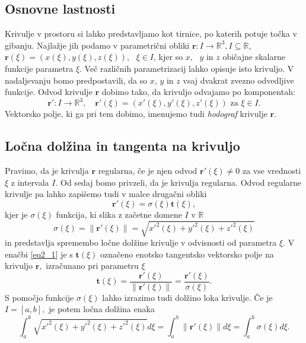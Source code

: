 \documentclass[12pt,a4paper,twoside]{article}
\theoremstyle{definition} %
\theoremstyle{plain} %
\numberwithin{equation}{section}  %
\newcommand{\R}{\mathbb R}
\begin{document}
\subsection{Osnovne lastnosti}

\cite{struik1961lectures}
Krivulje v prostoru si lahko predstavljamo kot tirnice, po katerih potuje točka v gibanju. Najlažje jih podamo
v parametrični obliki $\mathbf{r}:I \to \R^3, I \subseteq \R$, \newline $\mathbf{r}(\xi)=(x(\xi),y(\xi),z(\xi)), \text{ } \xi \in I$, kjer so 
$x,\text{ } y \text{ in } z$ običajne skalarne funkcije parametra $\xi.$ Več različnih parametrizacij lahko opisuje
isto krivuljo. V nadaljevanju bomo predpostavili, da so $x$, $y$ in $z$ vsaj dvakrat zvezno odvedljive funkcije.
Odvod krivulje $\mathbf{r}$ dobimo tako, da krivuljo odvajamo po komponentah:
$$\mathbf{r}':I \to \R^3, \quad \mathbf{r}'(\xi)=(x'(\xi),y'(\xi),z'(\xi)) \text{ za } \xi \in I.$$
Vektorsko polje, ki ga pri tem dobimo, imenujemo tudi \textit{hodograf} krivulje $\mathbf{r}.$

\subsection{Ločna dolžina in tangenta na krivuljo}

\cite{farouki2008pythagorean}
Pravimo, da je krivulja $\mathbf{r}$ regularna, če je njen odvod $\mathbf{r}'(\xi) \neq 0$ za vse vrednosti $\xi$ z intervala $I.$ Od sedaj bomo privzeli, da je krivulja regularna. Odvod regularne krivulje pa lahko zapišemo tudi v malce drugačni obliki
\begin{equation}
	\label{eq2_1}
	\mathbf{r'}(\xi)=\sigma(\xi)\mathbf{t}(\xi),
\end{equation}
kjer je $\sigma(\xi)$ funkcija, ki slika z začetne domene $I$ v $\R$
\begin{equation}
	\sigma(\xi)=\lVert \mathbf{r'}(\xi)\rVert=\sqrt{x'^2(\xi)+y'^2(\xi)+z'^2(\xi)}
\end{equation}
in predstavlja spremembo ločne dolžine krivulje v odvisnosti od parametra $\xi.$ V enačbi \eqref{eq2_1} je s $\mathbf{t}(\xi)$ označeno enotsko tangentsko vektorsko polje na krivuljo $\mathbf{r},$ izračunano pri parametru $\xi$
\begin{equation}
	\mathbf{t}(\xi)=\frac{\mathbf{r'}(\xi)}{\lVert \mathbf{r'}(\xi) \rVert}=
	\frac{\mathbf{r'}(\xi)}{\sigma(\xi)}.
\end{equation}
S pomočjo funkcije $\sigma(\xi)$ lahko izrazimo tudi dolžino loka krivulje. Če je $I=[a,b],$ je potem ločna dolžina enaka
\begin{equation}
	\int_a^b\sqrt{x'^2(\xi)+y'^2(\xi)+z'^2(\xi)}d\xi=\int_a^b\lVert \mathbf{r'}(\xi) \rVert d\xi =\int_a^b\sigma(\xi)d\xi.
\end{equation}
\end{document}
